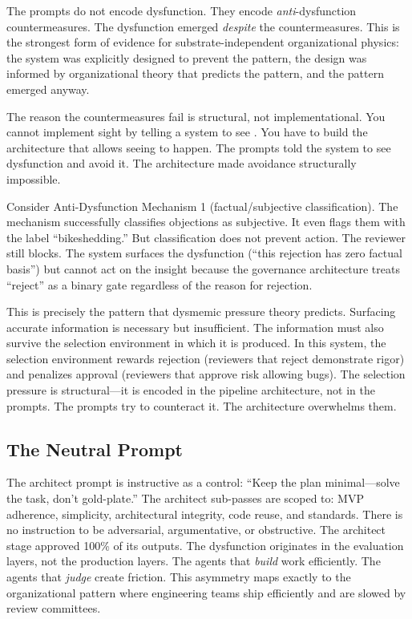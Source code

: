 \documentclass[11pt,a4paper]{article}
\begin{document}
The prompts do not encode dysfunction. They encode \emph{anti}-dysfunction countermeasures. The dysfunction emerged \emph{despite} the countermeasures. This is the strongest form of evidence for substrate-independent organizational physics: the system was explicitly designed to prevent the pattern, the design was informed by organizational theory that predicts the pattern, and the pattern emerged anyway.

The reason the countermeasures fail is structural, not implementational. You cannot implement sight by telling a system to see \citep{mcentire2024cage}. You have to build the architecture that allows seeing to happen. The prompts told the system to see dysfunction and avoid it. The architecture made avoidance structurally impossible.

Consider Anti-Dysfunction Mechanism 1 (factual/subjective classification). The mechanism successfully classifies objections as subjective. It even flags them with the label ``bikeshedding.'' But classification does not prevent action. The reviewer still blocks. The system surfaces the dysfunction (``this rejection has zero factual basis'') but cannot act on the insight because the governance architecture treats ``reject'' as a binary gate regardless of the reason for rejection.

This is precisely the pattern that dysmemic pressure theory predicts. Surfacing accurate information is necessary but insufficient. The information must also survive the selection environment in which it is produced. In this system, the selection environment rewards rejection (reviewers that reject demonstrate rigor) and penalizes approval (reviewers that approve risk allowing bugs). The selection pressure is structural---it is encoded in the pipeline architecture, not in the prompts. The prompts try to counteract it. The architecture overwhelms them.

\subsection{The Neutral Prompt}

The architect prompt is instructive as a control: ``Keep the plan minimal---solve the task, don't gold-plate.'' The architect sub-passes are scoped to: MVP adherence, simplicity, architectural integrity, code reuse, and standards. There is no instruction to be adversarial, argumentative, or obstructive. The architect stage approved 100\% of its outputs. The dysfunction originates in the evaluation layers, not the production layers. The agents that \emph{build} work efficiently. The agents that \emph{judge} create friction. This asymmetry maps exactly to the organizational pattern where engineering teams ship efficiently and are slowed by review committees.
\end{document}
